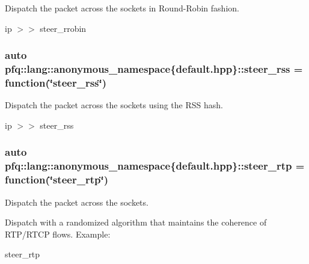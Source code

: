 Dispatch the packet across the sockets in Round-\/\+Robin fashion. 

ip $>$$>$ steer\+\_\+rrobin 
\subsubsection[{\texorpdfstring{steer\+\_\+rss}{steer_rss}}]{\setlength{\rightskip}{0pt plus 5cm}auto pfq\+::lang\+::anonymous\+\_\+namespace\{default.\+hpp\}\+::steer\+\_\+rss = {\bf function}(\char`\"{}steer\+\_\+rss\char`\"{})}\hypertarget{namespacepfq_1_1lang_1_1anonymous__namespace_02default_8hpp_03_ae5f71a205afe1a8e3ed959d4c555fcb9}{}\label{namespacepfq_1_1lang_1_1anonymous__namespace_02default_8hpp_03_ae5f71a205afe1a8e3ed959d4c555fcb9}


Dispatch the packet across the sockets using the R\+SS hash. 

ip $>$$>$ steer\+\_\+rss 
\subsubsection[{\texorpdfstring{steer\+\_\+rtp}{steer_rtp}}]{\setlength{\rightskip}{0pt plus 5cm}auto pfq\+::lang\+::anonymous\+\_\+namespace\{default.\+hpp\}\+::steer\+\_\+rtp = {\bf function}(\char`\"{}steer\+\_\+rtp\char`\"{})}\hypertarget{namespacepfq_1_1lang_1_1anonymous__namespace_02default_8hpp_03_ac3bc5ec07d93fa5d9266e0e08191fe22}{}\label{namespacepfq_1_1lang_1_1anonymous__namespace_02default_8hpp_03_ac3bc5ec07d93fa5d9266e0e08191fe22}


Dispatch the packet across the sockets. 

Dispatch with a randomized algorithm that maintains the coherence of R\+T\+P/\+R\+T\+CP flows. Example\+:

steer\+\_\+rtp 
